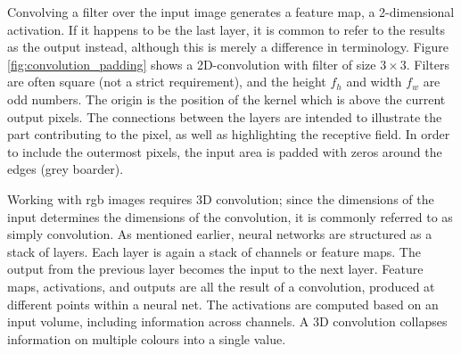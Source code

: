 
Convolving a filter over the input image generates a feature map, a 2-dimensional activation. If it happens to be the last layer, it is common to refer to the results as the output instead, although this is merely a difference in terminology. Figure \ref{fig:convolution_padding} shows a 2D-convolution with filter of size $3\times 3$. Filters are often square (not a strict requirement), and the height $f_h$ and width $f_w$ are odd numbers. The origin is the position of the kernel which is above the current output pixels. The connections between the layers are intended to illustrate the part contributing to the pixel, as well as highlighting the receptive field. In order to include the outermost pixels, the input area is padded with zeros around the edges (grey boarder). 


Working with \acrshort{rgb} images requires 3D convolution; since the dimensions of the input determines the dimensions of the convolution, it is commonly referred to as simply convolution. As mentioned earlier, neural networks are structured as a stack of layers. Each layer is again a stack of channels or feature maps. The output from the previous layer becomes the input to the next layer. Feature maps, activations, and outputs are all the result of a convolution, produced at different points within a neural net. The activations are computed based on an input volume, including information across channels. A 3D convolution collapses information on multiple colours into a single value.

